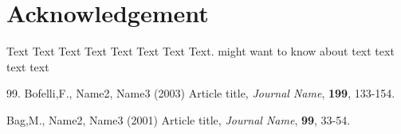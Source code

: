 \documentclass{Rpd}
\begin{document}
\section*{Acknowledgement}
Text Text Text Text Text Text  Text Text.  \cite{Boffelli03} might want to know about  text text text text

\begin{thebibliography}{99.}%
 Bofelli,F., Name2, Name3 (2003) Article title, {\it Journal Name}, {\bf 199}, 133-154.

 Bag,M., Name2, Name3 (2001) Article title, {\it Journal Name}, {\bf 99}, 33-54.

\end{thebibliography}
\end{document}
